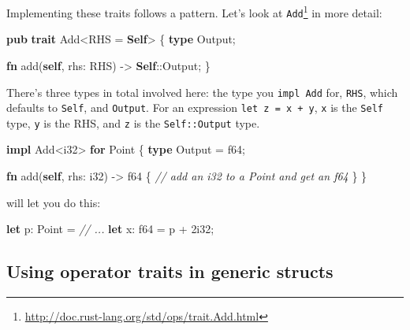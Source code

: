 \documentclass[a4paper,]{book}
\newenvironment{Shaded}{\begin{snugshade}}{\end{snugshade}}
\newcommand{\KeywordTok}[1]{\textcolor[rgb]{0.13,0.29,0.53}{\textbf{{#1}}}}
\newcommand{\DataTypeTok}[1]{\textcolor[rgb]{0.13,0.29,0.53}{{#1}}}
\newcommand{\DecValTok}[1]{\textcolor[rgb]{0.00,0.00,0.81}{{#1}}}
\newcommand{\CommentTok}[1]{\textcolor[rgb]{0.56,0.35,0.01}{\textit{{#1}}}}
\newcommand{\NormalTok}[1]{{#1}}
\renewcommand{\href}[2]{#2\footnote{\url{#1}}}
\begin{document}
Implementing these traits follows a pattern. Let's look at
\href{http://doc.rust-lang.org/std/ops/trait.Add.html}{\texttt{Add}} in
more detail:

\begin{Shaded}
\begin{Highlighting}[]
\KeywordTok{pub} \KeywordTok{trait} \NormalTok{Add<RHS = }\KeywordTok{Self}\NormalTok{> \{}
    \KeywordTok{type} \NormalTok{Output;}

    \KeywordTok{fn} \NormalTok{add(}\KeywordTok{self}\NormalTok{, rhs: RHS) -> }\KeywordTok{Self}\NormalTok{::Output;}
\NormalTok{\}}
\end{Highlighting}
\end{Shaded}

There's three types in total involved here: the type you
\texttt{impl\ Add} for, \texttt{RHS}, which defaults to \texttt{Self},
and \texttt{Output}. For an expression \texttt{let\ z\ =\ x\ +\ y},
\texttt{x} is the \texttt{Self} type, \texttt{y} is the RHS, and
\texttt{z} is the \texttt{Self::Output} type.

\begin{Shaded}
\begin{Highlighting}[]
\KeywordTok{impl} \NormalTok{Add<}\DataTypeTok{i32}\NormalTok{> }\KeywordTok{for} \NormalTok{Point \{}
    \KeywordTok{type} \NormalTok{Output = }\DataTypeTok{f64}\NormalTok{;}

    \KeywordTok{fn} \NormalTok{add(}\KeywordTok{self}\NormalTok{, rhs: }\DataTypeTok{i32}\NormalTok{) -> }\DataTypeTok{f64} \NormalTok{\{}
        \CommentTok{// add an i32 to a Point and get an f64}
    \NormalTok{\}}
\NormalTok{\}}
\end{Highlighting}
\end{Shaded}

will let you do this:

\begin{Shaded}
\begin{Highlighting}[]
\KeywordTok{let} \NormalTok{p: Point = }\CommentTok{// ...}
\KeywordTok{let} \NormalTok{x: }\DataTypeTok{f64} \NormalTok{= p + }\DecValTok{2i32}\NormalTok{;}
\end{Highlighting}
\end{Shaded}

\subsection{Using operator traits in generic
structs}\label{using-operator-traits-in-generic-structs}
\end{document}
